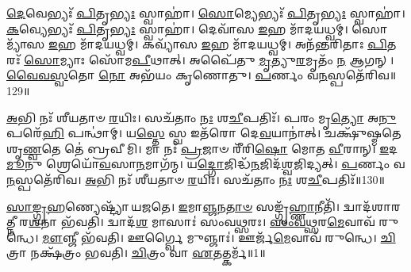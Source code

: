 \-\ul{𑌦𑍇}\-𑌵𑍇𑌭𑍍𑌯𑌃᳴ \ul{𑌪𑌿}\-𑌤𑍃\-\ul{𑌭𑍍𑌯𑌃} 𑌸𑍍𑌵𑌾𑌹𑌾॑।
\-\ul{𑌸𑍋}\-𑌮𑍍𑌯𑍇𑌭𑍍𑌯𑌃᳴ \ul{𑌪𑌿}\-𑌤𑍃\-\ul{𑌭𑍍𑌯𑌃} 𑌸𑍍𑌵𑌾𑌹𑌾॑।
\-\ul{𑌕}\-𑌵𑍍𑌯𑍇𑌭𑍍𑌯𑌃᳴ \ul{𑌪𑌿}\-𑌤𑍃\-\ul{𑌭𑍍𑌯𑌃} 𑌸𑍍𑌵𑌾𑌹𑌾॑।
𑌦𑍇𑌵𑌾᳴𑌸 \ul{𑌇}\-𑌹 𑌮𑌾᳴𑌦𑌯𑌧𑍍𑌵𑌮𑍍।
𑌸𑍋𑌮𑍍𑌯𑌾᳴𑌸 \ul{𑌇}\-𑌹 𑌮𑌾᳴𑌦𑌯𑌧𑍍𑌵𑌮𑍍।
𑌕𑌵𑍍𑌯𑌾᳴𑌸 \ul{𑌇}\-𑌹 𑌮𑌾᳴𑌦𑌯𑌧𑍍𑌵𑌮𑍍।
𑌅𑌨᳴𑌨𑍍𑌤𑌰𑌿𑌤𑌾𑌃 \ul{𑌪𑌿}\-𑌤𑌰𑌃᳴ \ul{𑌸𑍋}\-𑌮𑍍𑌯𑌾𑌃 𑌸𑍋᳴𑌮\-\ul{𑌪𑍀}\-𑌥𑌾𑌤𑍍।
𑌅𑌪𑍈᳴𑌤𑍁 \ul{𑌮𑍃}\-𑌤𑍍𑌯𑍁\-\ul{𑌰}\-𑌮𑍃𑌤𑌂᳴ \ul{𑌨} 𑌆𑌗𑌨𑍍।
\-\ul{𑌵𑍈}\-\-\ul{𑌵}\-\-\ul{𑌸𑍍𑌵}\-𑌤𑍋 \ul{𑌨𑍋} 𑌅𑌭᳴𑌯𑌂 𑌕𑍃𑌣𑍋𑌤𑍁।
\-\ul{𑌪}\-𑌰𑍍𑌣𑌂 𑌵\-\ul{𑌨}\-𑌸𑍍𑌪𑌤𑍇᳴𑌰𑌿𑌵॥129॥

\-\ul{𑌅}\-𑌭𑌿 𑌨𑌃᳴ 𑌶𑍀𑌯𑌤𑌾𑍞 \ul{𑌰}\-𑌯𑌿𑌃।
𑌸𑌚᳴𑌤𑌾𑌂 \ul{𑌨𑌃} 𑌶\-\ul{𑌚𑍀}\-𑌪𑌤𑌿𑌃᳴।
𑌪𑌰𑌂 𑌮𑍃\-\ul{𑌤𑍍𑌯𑍋} 𑌅\-\ul{𑌨𑍁} 𑌪𑌰𑍇᳴\-\ul{𑌹𑌿} 𑌪𑌨𑍍𑌥𑌾॑𑌮𑍍।
𑌯\-\ul{𑌸𑍍𑌤𑍇} 𑌸𑍍𑌵 𑌇𑌤᳴𑌰𑍋 𑌦𑍇\-\ul{𑌵}\-𑌯𑌾𑌨𑌾॑𑌤𑍍।
𑌚𑌕𑍍𑌷𑍁᳴𑌷𑍍𑌮𑌤𑍇 𑌶𑍃\-\ul{𑌣𑍍𑌵}\-𑌤𑍇 𑌤𑍇॑ 𑌬𑍍𑌰𑌵𑍀𑌮𑌿।
𑌮𑌾 𑌨𑌃᳴ \ul{𑌪𑍍𑌰}\-𑌜𑌾𑍞 𑌰𑍀᳴𑌰𑌿\-\ul{𑌷𑍋} 𑌮𑍋𑌤 \ul{𑌵𑍀}\-𑌰𑌾𑌨𑍍।
\-\ul{𑌇}\-𑌦\-\ul{𑌮𑍂}\-𑌨𑍁 𑌶𑍍𑌰𑍇𑌯𑍋᳴\-\ul{𑌵}\-𑌸𑌾\-\ul{𑌨}\-𑌮𑌾𑌗᳴𑌨𑍍𑌮।
𑌯\-\ul{𑌦𑍍𑌗𑍋}\-𑌜𑌿𑌦𑍍𑌧᳴\-\ul{𑌨}\-𑌜𑌿𑌦᳴\-\ul{𑌶𑍍𑌵}\-𑌜𑌿𑌦𑍍𑌯𑌤𑍍।
\-\ul{𑌪}\-𑌰𑍍𑌣𑌂 𑌵\-\ul{𑌨}\-𑌸𑍍𑌪𑌤𑍇᳴𑌰𑌿𑌵।
\-\ul{𑌅}\-𑌭𑌿 𑌨𑌃᳴ 𑌶𑍀𑌯𑌤𑌾𑍞 \ul{𑌰}\-𑌯𑌿𑌃।
𑌸𑌚᳴𑌤𑌾𑌂 \ul{𑌨𑌃} 𑌶\-\ul{𑌚𑍀}\-𑌪𑌤𑌿𑌃᳴॥130॥\anuvakamend[𑌵\-\ul{𑌨}\-𑌸𑍍𑌪𑌤𑌾᳴\-\ul{𑌵}\-𑌦𑍍𑌭𑍍𑌯𑍋 \ul{𑌲𑍋}\-𑌕𑌾 𑌦᳴𑌧𑌿\-\ul{𑌰𑍇} 𑌤𑍇𑌜᳴ 𑌇\-\ul{𑌨𑍍𑌦𑍍𑌰𑌿}\-𑌯𑌂 𑌧𑌾𑌮𑌾᳴𑌶𑍀𑌮𑌹𑍀\-\ul{𑌵𑌾}\-𑌭𑌿𑌨𑌃᳴ 𑌶𑍀𑌯𑌤𑌾𑍞 \ul{𑌰}\-𑌯𑌿𑌰𑍇𑌕𑌂᳴ 𑌚]




\clearpage
{}
\setcounter{anuvakam}{0}

\-\ul{𑌸𑌾}\-\-\ul{𑌙𑍍𑌗𑍍𑌰}\-\-\ul{𑌹}\-𑌣𑍍𑌯𑍇𑌷𑍍𑌟𑍍𑌯𑌾᳴ 𑌯𑌜𑌤𑍇।
\-\ul{𑌇}\-𑌮𑌾\-\ul{𑌞𑍍𑌜}\-𑌨\-\ul{𑌤𑌾}\-\-\ul{𑍞} 𑌸𑌙𑍍𑌗𑍃᳴\-\ul{𑌹𑍍𑌣𑌾}\-𑌨𑍀𑌤𑌿᳴।
𑌦𑍍𑌵𑌾𑌦᳴𑌶𑌾𑌰𑌤𑍍𑌨𑍀 𑌰\-\ul{𑌶}\-𑌨𑌾 𑌭᳴𑌵𑌤𑌿।
𑌦𑍍𑌵𑌾𑌦᳴\-\ul{𑌶} 𑌮𑌾𑌸𑌾𑌃॑ 𑌸𑌂𑌵\-\ul{𑌥𑍍𑌸}\-𑌰𑌃।
\-\ul{𑌸𑌂}\-\-\ul{𑌵}\-\-\ul{𑌥𑍍𑌸}\-𑌰\-\ul{𑌮𑍇}\-𑌵𑌾𑌵᳴ 𑌰𑍁𑌨𑍍𑌧𑍇।
\-\ul{𑌮𑍗}\-𑌞𑍍𑌜𑍀 𑌭᳴𑌵𑌤𑌿।
𑌊𑌰𑍍𑌗𑍍𑌵𑍈 𑌮𑍁𑌞𑍍𑌜𑌾𑌃॑।
𑌊𑌰𑍍𑌜᳴\-\-\ul{𑌮𑍇}\-𑌵𑌾𑌵᳴ 𑌰𑍁𑌨𑍍𑌧𑍇।
\-\ul{𑌚𑌿}\-𑌤𑍍𑌰𑌾 𑌨𑌕𑍍𑌷᳴𑌤𑍍𑌰𑌂 𑌭𑌵𑌤𑌿।
\-\ul{𑌚𑌿}\-𑌤𑍍𑌰𑌂 𑌵𑌾 \ul{𑌏}\-𑌤𑌤𑍍𑌕𑌰𑍍𑌮᳴॥1॥

